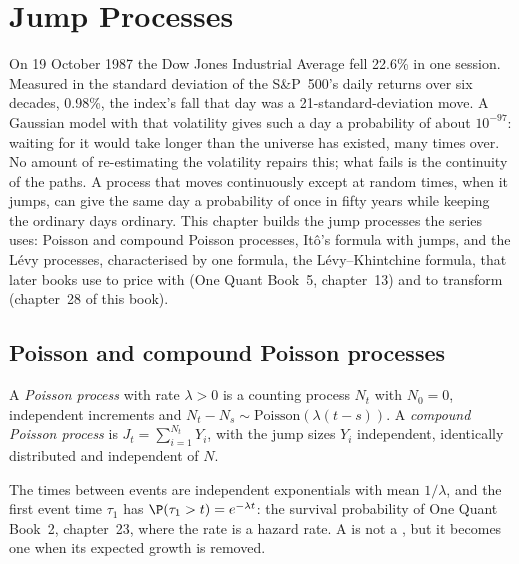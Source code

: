 \chapter{Jump Processes}\label{ch:qm:jump-processes}

On 19 October 1987 the Dow Jones Industrial Average fell 22.6\% in one session. Measured in
the standard deviation of the S\&P~500's daily returns over six decades, 0.98\%, the index's fall
that day was a 21-standard-deviation move. A Gaussian model with that volatility gives such a
day a probability of about $10^{-97}$: waiting for it would take longer than the universe has
existed, many times over. No amount of re-estimating the volatility repairs this; what fails is
the continuity of the paths. A process that moves continuously except at random times, when it
jumps, can give the same day a probability of once in fifty years while keeping the ordinary
days ordinary. This chapter builds the jump processes the series uses: Poisson and compound
Poisson processes, Itô's formula with jumps, and the Lévy processes, characterised by one
formula, the Lévy--Khintchine formula, that later books use to price with (One Quant Book~5,
chapter~13) and to transform (chapter~28 of this book).

\section{Poisson and compound Poisson processes}

\begin{definition}\label{def:qm:jump-processes:poisson}
A \emph{Poisson process} with rate $\lambda > 0$ is a counting process $N_t$ with $N_0 =
0$, independent increments and $N_t - N_s \sim \mathrm{Poisson}(\lambda(t - s))$. A \emph{compound Poisson
process} is $J_t = \sum_{i=1}^{N_t}Y_i$, with the jump sizes $Y_i$
independent, identically distributed and independent of $N$.
\end{definition}

The times between events are independent exponentials with mean $1/\lambda$, and the first event
time $\tau_1$ has $\P(\tau_1 > t) = e^{-\lambda t}$: the survival probability of One Quant Book~2,
chapter~23, where the rate is a hazard rate. A  is not a , but it
becomes one when its expected growth is removed.

